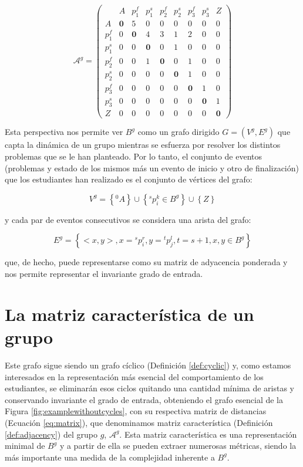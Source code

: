 \begin{equation}\label{eq:matrix}
\mathcal{A}^g = 
\left(
\begin{array}{c|cccccccc}
    & A & p_1^f & p_1^s & p_2^f & p_2^s & p_3^f & p_3^s & Z \\
  \hline
  A & \textbf{0} & 5 & 0 & 0 & 0 & 0 & 0 & 0 \\
  p_1^f & 0 & \textbf{0} & 4 & 3 & 1 & 2 & 0 & 0 \\
  p_1^s & 0 & 0 & \textbf{0} & 0 & 1 & 0 & 0 & 0 \\
  p_2^f & 0 & 0 & 1 & \textbf{0} & 0 & 1 & 0 & 0 \\
  p_2^s & 0 & 0 & 0 & 0 & \textbf{0} & 1 & 0 & 0 \\
  p_3^f & 0 & 0 & 0 & 0 & 0 & \textbf{0} & 1 & 0\\
  p_3^s & 0 & 0 & 0 & 0 & 0 & 0 & \textbf{0} & 1 \\
  Z & 0 & 0 & 0 & 0 & 0 & 0 & 0 & \textbf{0}
\end{array}
\right)
\end{equation}

Esta perspectiva nos permite ver $B^g$ como un grafo dirigido $G = (V^g,E^g)$ que capta la dinámica de un grupo mientras se esfuerza por resolver los distintos problemas que se le han planteado. Por lo tanto, el conjunto de eventos (problemas y estado de los mismos más un evento de inicio y otro de finalización) que los estudiantes han realizado es el conjunto de vértices del grafo:

\begin{equation}
V^g = \left\lbrace ^0A \right\rbrace \cup \left\lbrace ^sp_i^k \in B^g \right\rbrace \cup \left\lbrace Z \right\rbrace
\end{equation}

y cada par de eventos consecutivos se considera una arista del grafo:

\begin{equation}
E^g = \left\lbrace <x,y>, x = {}^sp_i^r, y = {}^tp_j^l, t = s+1, x,y \in B^g\right\rbrace
\end{equation}

que, de hecho, puede representarse como su matriz de adyacencia ponderada y nos permite representar el invariante grado de entrada.

\section{La matriz característica de un grupo}

Este grafo sigue siendo un grafo cíclico (Definición \ref{def:cyclic}) y, como estamos interesados en la representación más esencial del comportamiento de los estudiantes, se eliminarán esos ciclos quitando una cantidad mínima de aristas y conservando invariante el grado de entrada, obteniendo el grafo esencial de la Figura \ref{fig:examplewithoutcycles}, con su respectiva matriz de distancias (Ecuación \ref{eq:matrix}), que denominamos matriz característica (Definición \ref{def:adjacency}) del grupo $g$, $\mathcal{A}^g$. Esta matriz característica es una representación minimal de $B^g$ y a partir de ella se pueden extraer numerosas métricas, siendo la más importante una medida de la complejidad inherente a $B^g$.

